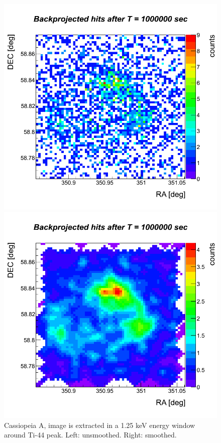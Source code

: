 \begin{figure}[ht]
  \begin{minipage}[c]{0.48\linewidth}
    \begin{center}
      \includegraphics[scale=0.3]{CasA/CasA_it2b_B6_Smooth0.png}  
    \end{center}
  \end{minipage}
  \hspace{0.04\linewidth}
  \begin{minipage}[c]{0.48\linewidth}
    \begin{center}
      \includegraphics[scale=0.3]{CasA/CasA_it2b_B6_Smooth2.png}  
    \end{center}
  \end{minipage}
  \caption{Cassiopeia A, image is extracted in a 1.25 keV energy window around Ti-44 peak. Left: unsmoothed. Right: smoothed.}
\end{figure}

